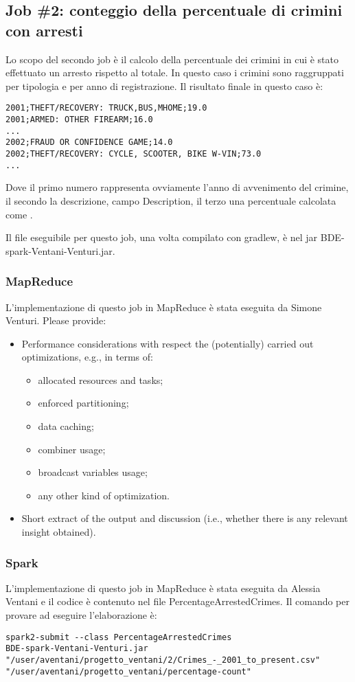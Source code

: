 \documentclass[10pt]{article}
\begin{document}
\subsection{Job \#2: conteggio della percentuale di crimini con arresti}
Lo scopo del secondo job è il calcolo della percentuale dei crimini in cui è stato effettuato un arresto rispetto al totale. In questo caso i crimini sono raggruppati per tipologia e per anno di registrazione.
Il risultato finale in questo caso è:
\begin{lstlisting}
2001;THEFT/RECOVERY: TRUCK,BUS,MHOME;19.0
2001;ARMED: OTHER FIREARM;16.0
...
2002;FRAUD OR CONFIDENCE GAME;14.0
2002;THEFT/RECOVERY: CYCLE, SCOOTER, BIKE W-VIN;73.0
...
\end{lstlisting}
Dove il primo numero rappresenta ovviamente l'anno di avvenimento del crimine, il secondo la descrizione, campo Description, il terzo una percentuale calcolata come
 .

Il file eseguibile per questo job, una volta compilato con gradlew, è nel jar BDE-spark-Ventani-Venturi.jar. 

\subsubsection{MapReduce}
L'implementazione di questo job in MapReduce è stata eseguita da Simone Venturi.
Please provide:
\begin{itemize}
\item Performance considerations with respect the (potentially) carried out optimizations, e.g., in terms of:
\begin{itemize}
\item allocated resources and tasks;
\item enforced partitioning;
\item data caching;
\item combiner usage;
\item broadcast variables usage;
\item any other kind of optimization.
\end{itemize}
\item Short extract of the output and discussion (i.e., whether there is any relevant insight obtained).
\end{itemize}

\subsubsection{Spark}
L'implementazione di questo job in MapReduce è stata eseguita da Alessia Ventani e il codice è contenuto nel file PercentageArrestedCrimes.
Il comando per provare ad eseguire l'elaborazione è:
\begin{lstlisting}
spark2-submit --class PercentageArrestedCrimes 
BDE-spark-Ventani-Venturi.jar 
"/user/aventani/progetto_ventani/2/Crimes_-_2001_to_present.csv" 
"/user/aventani/progetto_ventani/percentage-count"
\end{lstlisting}
\end{document}
